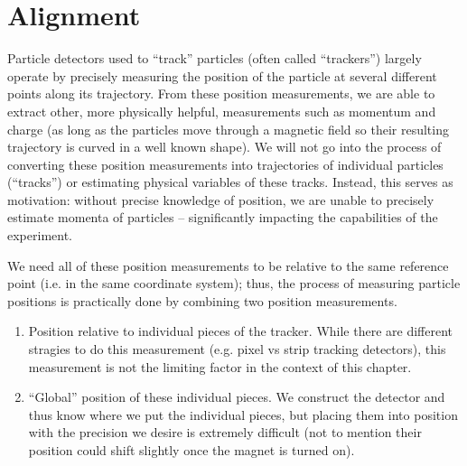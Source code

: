 \chapter{Alignment}
\label{chapter:hps:alignment}

Particle detectors used to ``track'' particles (often called ``trackers'')
largely operate by precisely measuring the position of the particle at several
different points along its trajectory.
From these position measurements, we are able to extract other,
more physically helpful, measurements such as momentum and charge
(as long as the particles move through a magnetic field so their resulting
trajectory is curved in a well known shape).
We will not go into the process of converting these position measurements
into trajectories of individual particles (``tracks'')
or estimating physical variables of these tracks.
Instead, this serves as motivation:
without precise knowledge of position, we are unable to precisely estimate
momenta of particles -- significantly impacting the capabilities of the
experiment.

We need all of these position measurements to be relative
to the same reference point (i.e. in the same coordinate system);
thus, the process of measuring particle positions is practically
done by combining two position measurements.
\begin{enumerate}
	\item Position relative to individual pieces of the tracker.
	      While there are different stragies to do this measurement
	      (e.g. pixel vs strip tracking detectors), this measurement
	      is not the limiting factor in the context of this chapter.
	\item ``Global'' position of these individual pieces.
	      We construct the detector and thus know where we put the
	      individual pieces, but placing them into position with
	      the precision we desire is extremely difficult (not to
	      mention their position could shift slightly once the
	      magnet is turned on).
\end{enumerate}